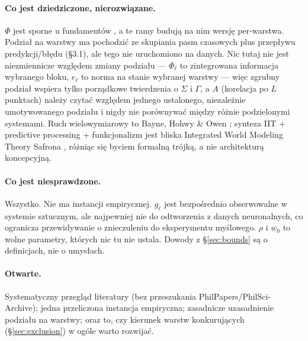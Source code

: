 \documentclass[11pt]{article}
\begin{document}
\paragraph{Co jest dziedziczone, nierozwiązane.} $\Phi$ jest sporne u fundamentów \cite{barrett2019,hanson2023}, a te ramy budują na nim wersję per-warstwa. Podział na warstwy ma pochodzić ze skupiania pasm czasowych plus przepływu predykcji/błędu (\S3.1), ale tego nie uruchomiono na danych. Nic tutaj nie jest niezmiennicze względem zmiany podziału --- $\Phi_\ell$ to zintegrowana informacja wybranego bloku, $e_\ell$ to norma na stanie wybranej warstwy --- więc zgrubny podział wspiera tylko porządkowe twierdzenia o $\Sigma$ i $\Gamma$, a $A$ (korelacja po $L$ punktach) należy czytać względem jednego ustalonego, niezależnie umotywowanego podziału i nigdy nie porównywać między różnie podzielonymi systemami. Ruch wielowymiarowy to Bayne, Hohwy \& Owen \cite{bayne2016}; synteza IIT + predictive processing + funkcjonalizm jest bliska Integrated World Modeling Theory Safrona \cite{safron2020}, różniąc się byciem formalną trójką, a nie architekturą koncepcyjną.

\paragraph{Co jest niesprawdzone.} Wszystko. Nie ma instancji empirycznej. $g_\ell$ jest bezpośrednio obserwowalne w systemie sztucznym, ale najpewniej nie do odtworzenia z danych neuronalnych, co ogranicza przewidywanie o znieczuleniu do eksperymentu myślowego. $\rho$ i $w_0$ to wolne parametry, których nic tu nie ustala. Dowody z \S\ref{sec:bounds} są o definicjach, nie o umysłach.

\paragraph{Otwarte.} Systematyczny przegląd literatury (bez przeszukania PhilPapers/PhilSci-Archive); jedna przeliczona instancja empiryczna; zasadnicze uzasadnienie podziału na warstwy; oraz to, czy kierunek warstw konkurujących (\S\ref{sec:exclusion}) w ogóle warto rozwijać.
\end{document}

